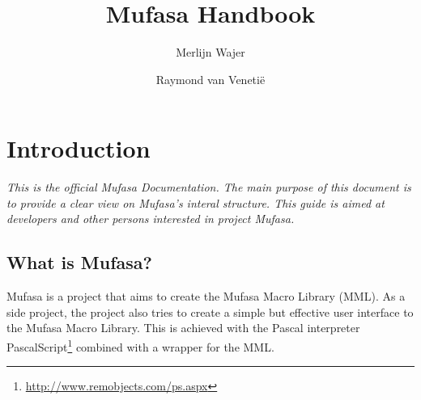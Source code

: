 \documentclass[a4paper, 10pt]{report} %
\begin{document}
\title{Mufasa Handbook}
\author{Merlijn Wajer \and Raymond van Veneti\"{e}}
\maketitle
\tableofcontents

\chapter{Introduction}

\emph{This is the official Mufasa Documentation.
The main purpose of this document is to provide a clear view on Mufasa's 
interal structure. This guide is aimed at developers and other persons
interested in project Mufasa.}

\section{What is Mufasa?}

Mufasa is a project that aims to create the Mufasa Macro Library (MML).
As a side project, the project also tries to create a simple but effective
user interface to the Mufasa Macro Library. This is achieved with the
Pascal interpreter PascalScript\footnote{
\url{http://www.remobjects.com/ps.aspx}} combined with a wrapper for the MML.
\end{document}
